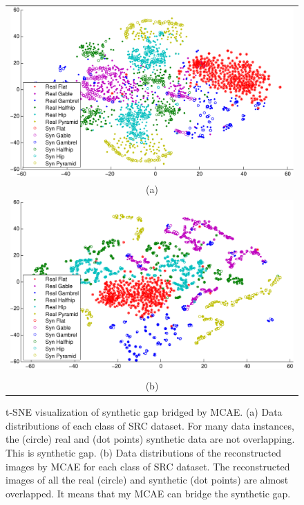 \documentclass{iitthesis}
\begin{document}
\begin{figure}
\centering
\begin{tabular}{c}
\includegraphics[scale=0.85]{Pic/PDF/Autoencoder/tsne_visualization/original} 
\\
(a)
\\
\includegraphics[scale=0.85]{Pic/PDF/Autoencoder/tsne_visualization/reconst}\tabularnewline
\\
(b)
\\
\end{tabular}
\caption{\label{fig:t-SNE-visualization-of}t-SNE \cite{tsne} visualization of synthetic gap bridged by MCAE. (a) Data distributions of each class of SRC dataset. For many data instances, the (circle) real and (dot
points) synthetic data are not overlapping. This is synthetic gap. (b) Data distributions of the reconstructed images by MCAE for each class of SRC dataset. The reconstructed images of all the real (circle) and synthetic (dot points) are almost overlapped. It means that my MCAE can bridge the synthetic gap.}
\end{figure}
\end{document}

